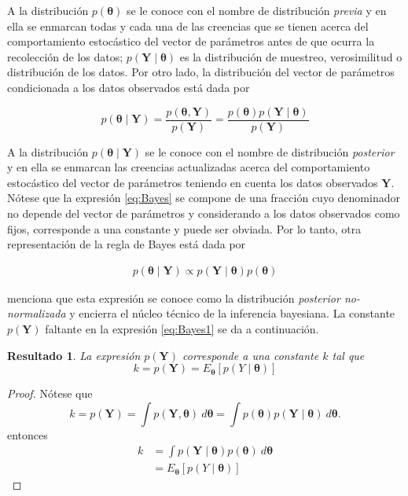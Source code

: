 \documentclass[
  10pt,
  spanish,
]{book}
\newtheorem{proposition}{Resultado}[chapter]
\theoremstyle{definition}
\theoremstyle{definition}
\theoremstyle{definition}
\theoremstyle{definition}
\theoremstyle{remark}
\begin{document}
A la distribución \(p(\boldsymbol \theta)\) se le conoce con el nombre de
distribución \emph{previa} y en ella se enmarcan todas y cada una de las
creencias que se tienen acerca del comportamiento estocástico del vector
de parámetros antes de que ocurra la recolección de los datos; \(p(\mathbf{Y} \mid \boldsymbol \theta)\) es la distribución de muestreo,
verosimilitud o distribución de los datos. Por otro lado, la
distribución del vector de parámetros condicionada a los datos
observados está dada por

\begin{equation}
\label{eq:Bayes}
p(\boldsymbol \theta\mid \mathbf{Y})=\frac{p(\boldsymbol \theta,\mathbf{Y})}{p(\mathbf{Y})}=\frac{p(\boldsymbol \theta)p(\mathbf{Y} \mid \boldsymbol \theta)}{p(\mathbf{Y})}
\end{equation}

A la distribución \(p(\boldsymbol \theta\mid \mathbf{Y})\) se le conoce con el
nombre de distribución \emph{posterior} y en ella se enmarcan las
creencias actualizadas acerca del comportamiento estocástico del vector
de parámetros teniendo en cuenta los datos observados \(\mathbf{Y}\).
Nótese que la expresión \eqref{eq:Bayes} se compone de una fracción cuyo
denominador no depende del vector de parámetros y considerando a los
datos observados como fijos, corresponde a una constante y puede ser
obviada. Por lo tanto, otra representación de la regla de Bayes está
dada por

\begin{align}
\label{eq:Bayes1}
p(\boldsymbol \theta\mid \mathbf{Y})\propto p(\mathbf{Y} \mid \boldsymbol \theta)p(\boldsymbol \theta)
\end{align}

\citet{Gelman03} menciona que esta expresión se conoce como la
distribución \emph{posterior no-normalizada} y encierra el núcleo
técnico de la inferencia bayesiana. La constante \(p(\mathbf{Y})\)
faltante en la expresión \eqref{eq:Bayes1} se da a continuación.

\begin{proposition}
\protect\hypertarget{prp:Res131}{}{\label{prp:Res131} }La expresión \(p(\mathbf{Y})\) corresponde a una constante \(k\) tal que
\begin{equation*}
k=p(\mathbf{Y})=E_{\boldsymbol \theta}[p(Y \mid \boldsymbol \theta)]
\end{equation*}
\end{proposition}

\begin{proof}
{}Nótese que
\begin{equation*}
k=p(\mathbf{Y})=\int p(\mathbf{Y},\boldsymbol \theta)\ d\boldsymbol \theta=\int p(\boldsymbol \theta)p(\mathbf{Y} \mid \boldsymbol \theta)\ d\boldsymbol \theta.
\end{equation*}
entonces
\begin{align*}
k&=\int p(\mathbf{Y} \mid \boldsymbol \theta)p(\boldsymbol \theta)\ d\boldsymbol \theta\\
&=E_{\boldsymbol \theta}[p(Y \mid \boldsymbol \theta)]
\end{align*}
\end{proof}
\end{document}
